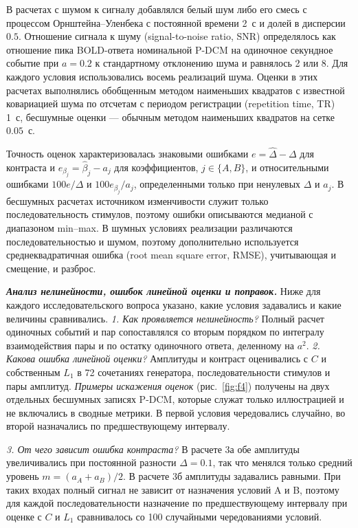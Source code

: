 В расчетах с шумом к сигналу добавлялся белый шум либо его смесь с процессом Орнштейна--Уленбека с постоянной времени 2~с и долей в дисперсии $0.5$. Отношение сигнала к шуму (signal-to-noise ratio, SNR) определялось как отношение пика BOLD-ответа номинальной P-DCM на одиночное секундное событие при $a=0.2$ к стандартному отклонению шума и равнялось 2 или 8. Для каждого условия использовались восемь реализаций шума. Оценки в этих расчетах выполнялись обобщенным методом наименьших квадратов с известной ковариацией шума по отсчетам с периодом регистрации (repetition time, TR) 1~с, бесшумные оценки --- обычным методом наименьших квадратов на сетке $0.05$~с.

Точность оценок характеризовалась знаковыми ошибками $e=\hat\Delta-\Delta$ для контраста и $e_{\beta_j}=\hat\beta_j-a_j$ для коэффициентов, $j\in\{A,B\}$, и относительными ошибками $100e/\Delta$ и $100e_{\beta_j}/a_j$, определенными только при ненулевых $\Delta$ и $a_j$. В бесшумных расчетах источником изменчивости служит только последовательность стимулов, поэтому ошибки описываются медианой с диапазоном min--max. В шумных условиях реализации различаются последовательностью и шумом, поэтому дополнительно используется среднеквадратичная ошибка (root mean square error, RMSE), учитывающая и смещение, и разброс.

\textbf{\textit{Анализ нелинейности, ошибок линейной оценки и поправок.}} Ниже для каждого исследовательского вопроса указано, какие условия задавались и какие величины сравнивались. \textit{1. Как проявляется нелинейность?} Полный расчет одиночных событий и пар сопоставлялся со вторым порядком по интегралу взаимодействия пары и по остатку одиночного ответа, деленному на $a^2$. \textit{2. Какова ошибка линейной оценки?} Амплитуды и контраст оценивались с $C$ и собственным $L_1$ в 72 сочетаниях генератора, последовательности стимулов и пары амплитуд. \textit{Примеры искажения оценок} (рис.~\ref{fig:f4}) получены на двух отдельных бесшумных записях P-DCM, которые служат только иллюстрацией и не включались в сводные метрики. В первой условия чередовались случайно, во второй назначались по предшествующему интервалу.

\textit{3. От чего зависит ошибка контраста?} В расчете 3а обе амплитуды увеличивались при постоянной разности $\Delta=0.1$, так что менялся только средний уровень $m=(a_A+a_B)/2$. В расчете 3б амплитуды задавались равными. При таких входах полный сигнал не зависит от назначения условий A и B, поэтому для каждой последовательности назначение по предшествующему интервалу при оценке с $C$ и $L_1$ сравнивалось со 100 случайными чередованиями условий.

